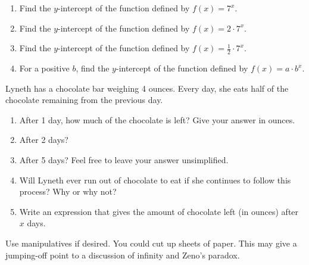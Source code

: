 \documentclass[noauthor,noinstructornotes]{ximera}
\begin{document}
\begin{problem}
\begin{enumerate}
    \item Find the \(y\)-intercept of the function defined by \(f\left(x\right)=7^x\).
    \item Find the \(y\)-intercept of the function defined by \(f\left(x\right)=2\cdot 7^x\).
    \item Find the \(y\)-intercept of the function defined by \(f\left(x\right)=\frac{1}{2}\cdot 7^x\).
    \item For a positive \(b\), find the \(y\)-intercept of the function defined by \(f\left(x\right)=a\cdot b^x\).
\end{enumerate}
\end{problem}

\begin{problem}
Lyneth has a chocolate bar weighing 4 ounces. Every day, 
she eats half of the chocolate remaining from the previous day.

\begin{enumerate}
    \item After 1 day, how much of the chocolate is left? 
    Give your answer in ounces.
    \item After 2 days?
    \item After 5 days? Feel free to leave your answer unsimplified.
    \item Will Lyneth ever run out of chocolate to eat if she
    continues to follow this process? Why or why not?
    \item Write an expression that gives the amount of chocolate left
    (in ounces) after \(x\) days.
\end{enumerate}

\begin{instructorNotes}
Use manipulatives if desired. You could cut up sheets of paper. This may
give a jumping-off point to a discussion of infinity and Zeno's paradox.
\end{instructorNotes}
\end{problem}
\end{document}
